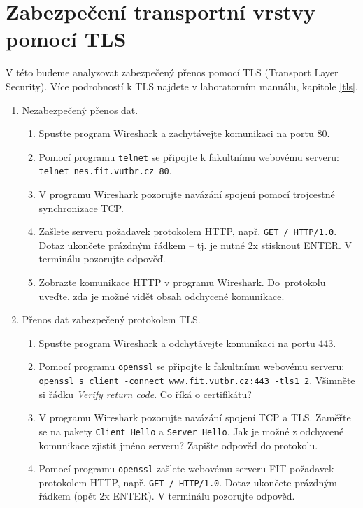 \documentclass[a4paper,11pt]{article}
\begin{document}
\section{Zabezpečení transportní vrstvy pomocí TLS}
V této budeme analyzovat zabezpečený přenos pomocí TLS (Transport Layer Security). Více podrobností k TLS najdete v laboratorním manuálu, kapitole \ref{tls}. 
\begin{enumerate}
  \item Nezabezpečený přenos dat.
    \begin{enumerate}
      \item Spusťte program Wireshark a zachytávejte komunikaci na portu 80.
      \item Pomocí programu {\tt telnet} se připojte k fakultnímu webovému
        serveru: \\ \verb|telnet nes.fit.vutbr.cz 80|.
      \item V programu Wireshark pozorujte navázání spojení pomocí trojcestné synchronizace TCP.
      \item Zašlete serveru požadavek protokolem HTTP, např. \verb|GET / HTTP/1.0|. Dotaz ukončete prázdným řádkem -- tj. je nutné 2x stisknout ENTER. V terminálu pozorujte odpověď.
      \item Zobrazte komunikace HTTP v programu Wireshark.  Do~protokolu uveďte, zda je možné vidět obsah odchycené komunikace.
    \end{enumerate}

  \item Přenos dat zabezpečený protokolem TLS.
    \begin{enumerate}
      \item Spusťte program Wireshark a odchytávejte komunikaci na portu 443.
      \item Pomocí programu {\tt openssl} se připojte k fakultnímu webovému  serveru: \\ \verb|openssl s_client -connect www.fit.vutbr.cz:443 -tls1_2|. Všimněte si řádku \emph{Verify return code}. Co říká o certifikátu?

      \item V programu Wireshark pozorujte navázání spojení TCP a TLS. Zaměřte se na pakety {\tt Client Hello} a {\tt Server Hello}. Jak je možné z odchycené komunikace zjistit jméno serveru? Zapište odpověď do protokolu.

      \item Pomocí programu \texttt{openssl} zašlete webovému serveru FIT požadavek protokolem HTTP, např. \verb|GET / HTTP/1.0|. Dotaz ukončete prázdným řádkem (opět 2x ENTER). V terminálu pozorujte odpověď.


\end{enumerate}
\end{enumerate}
\end{document}
